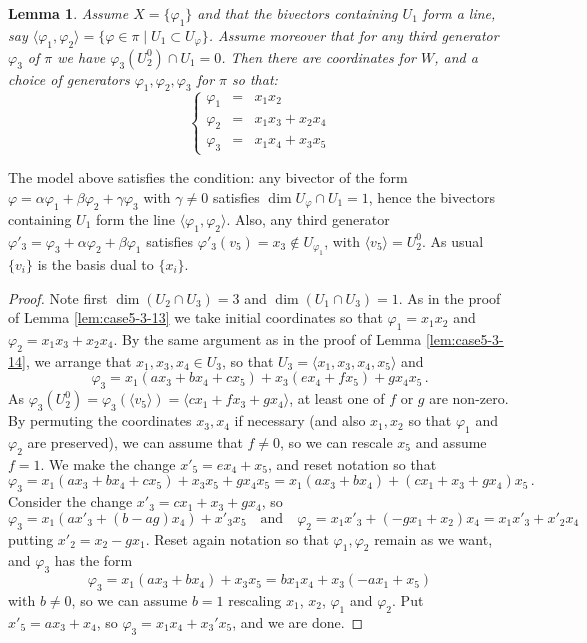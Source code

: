 \documentclass[10pt,reqno]{amsart}
\newcommand{\la}{\langle}
\newcommand{\ra}{\rangle}
\renewcommand{\a}{\alpha}
\renewcommand{\b}{\beta}
\newcommand{\g}{\gamma}
\newcommand{\f}{\varphi}
\newcommand{\tr}[1]{\textrm{#1}}
\newtheorem{lemma}[theorem]{Lemma}
\theoremstyle{definition}
\begin{document}
\begin{lemma}\label{lem:case5-3-15}
Assume $X=\{\f_1\}$ and that the bivectors containing $U_1$ form a line, say $\langle \f_1, \f_2 \rangle =\{\f \in \pi \mid U_1\subset U_{\f}\}$. Assume moreover that for any third generator $\f_3$ of $\pi$ we have $\f_3(U^0_2) \cap U_1=0$. Then there are coordinates for $W$, and a choice of generators $\f_1, \f_2, \f_3$ for $\pi$ so that:
\[ 
\left\{\begin{array}{ccl}
 \f_1 & = & x_1x_2\\
 \f_2 & = & x_1x_3+x_2x_4\\
 \f_3 & = & x_1x_4+x_3x_5
\end{array}\right.
\]
\end{lemma}

\noindent The model above satisfies the condition: any bivector of the form $\f=\a\f_1+\b\f_2 + \g\f_3$ with $\g \ne 0$ satisfies $\dim U_{\f} \cap U_1=1$, hence the bivectors containing $U_1$ form the line $\la \f_1, \f_2 \ra$. Also, any third generator $\f'_3=\f_3+\a\f_2+\b \f_1$ satisfies $\f'_3(v_5)=x_3 \notin U_{\f_1}$, with $\la v_5 \ra=U_2^0$. As usual $\{v_i\}$ is the basis dual to $\{x_i\}$.
\begin{proof}
Note first $\dim(U_2 \cap U_3)=3$ and $\dim(U_1 \cap U_3)=1$. 
As in the proof of Lemma \ref{lem:case5-3-13} we take initial coordinates so that $\f_1=x_1x_2$ and $\f_2=x_1x_3+x_2x_4$. By the same argument as in the proof of Lemma \ref{lem:case5-3-14}, we arrange that $x_1, x_3, x_4 \in U_3$, so that $U_3=\la x_1,x_3,x_4,x_5\ra$ and
\[
\f_3=x_1(ax_3+bx_4+cx_5)+x_3(ex_4+fx_5)+gx_4x_5 \, .
\]
As $\f_3(U_2^0)=\f_3(\langle v_5 \rangle)=\langle cx_1+fx_3+gx_4 \rangle$, at least one of $f$ or $g$ are non-zero. By permuting the coordinates $x_3, x_4$ if necessary (and also $x_1,x_2$ so that $\f_1$ and $\f_2$ are preserved), we can assume that $f \ne 0$, so we can rescale $x_5$ and assume $f=1$. We make the change $x'_5=ex_4+x_5$, and reset notation so that
\[
\f_3=x_1(ax_3+bx_4+cx_5)+x_3x_5+gx_4x_5=x_1(ax_3+bx_4)+(cx_1+x_3+gx_4)x_5 \, .
\]
Consider the change $x'_3=cx_1+x_3+gx_4$, so 
\[
\f_3=x_1(ax'_3+(b-ag)x_4)+x'_3x_5\quad \tr{and} \quad \f_2=x_1x'_3+(-gx_1+x_2)x_4=x_1x'_3+x'_2x_4
\]
putting $x'_2=x_2-gx_1$. Reset again notation so that $\f_1, \f_2$ remain as we want, and $\f_3$ has the form
\[
\f_3=x_1(ax_3+bx_4)+x_3x_5=bx_1x_4+x_3(-ax_1+x_5)
\]
with $b \ne 0$, so we can assume $b=1$ rescaling $x_1$, $x_2$, $\f_1$ and $\f_2$. Put $x'_5=ax_3+x_4$, so $\f_3=x_1x_4+x_3'x_5$, and we are done.
\end{proof}
\end{document}
